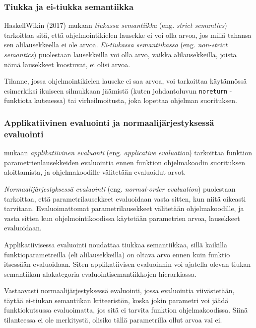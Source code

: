 
\subsubsection{Tiukka ja ei-tiukka semantiikka}

HaskellWikin (2017) mukaan \textit{tiukassa semantiikka} (eng. \textit{strict semantics}) tarkoittaa sitä, että ohjelmointikielen lausekke ei voi olla arvoa, jos millä tahansa sen alilausekkeella ei ole arvoa. \textit{Ei-tiukassa semantiikassa} (eng. \textit{non-strict semantics}) puolestaan lausekkeilla voi olla arvo, vaikka alilausekkeilla, joista nämä lausekkeet koostuvat, ei olisi arvoa.

Tilanne, jossa ohjelmointikielen lauseke ei saa arvoa, voi tarkoittaa käytännössä esimerkiksi ikuiseen silmukkaan jäämistä (kuten johdantoluvun \verb!noreturn! -funktiota kutsuessa) tai virheilmoitusta, joka lopettaa ohjelman suorituksen.

\subsubsection{Applikatiivinen evaluointi ja normaalijärjestyksessä evaluointi}

\citet{scott2009programming} mukaan \textit{applikatiivinen evaluonti} (eng. \textit{applicative evaluation}) tarkoittaa funktion parametrienlausekkeiden evaluointia ennen funktion ohjelmakoodin suorituksen aloittamista, ja ohjelmakoodille välitetään evaluoidut arvot.

\textit{Normaalijärjestyksessä evaluointi} (eng. \textit{normal-order evaluation}) puolestaan tarkoittaa, että parametrilausekkeet evaluoidaan vasta sitten, kun niitä oikeasti tarvitaan. Evaluoimattomat parametrilausekkeet välitetään ohjelmakoodille, ja vasta sitten kun ohjelmointikoodissa käytetään parametrien arvoa, lausekkeet evaluoidaan.

Applikatiivisessa evaluointi noudattaa tiukkaa semantiikkaa, sillä kaikilla funktioparametreilla (eli alilausekkeilla) on oltava arvo ennen kuin funktio itsessään evaluoidaan. Siten applikatiivisen evaluoinnin voi ajatella olevan tiukan semantiikan alakategoria evaluointisemantiikkojen hierarkiassa.

Vastaavasti normaalijärjestyksessä evaluointi, jossa evaluointia viivästetään, täytää ei-tiukan semantiikan kriteeristön, koska jokin parametri voi jäädä funktiokutsussa evaluoimatta, jos sitä ei tarvita funktion ohjelmakoodissa. Siinä tilanteessa ei ole merkitystä, olisiko tällä parametrilla ollut arvoa vai ei.


